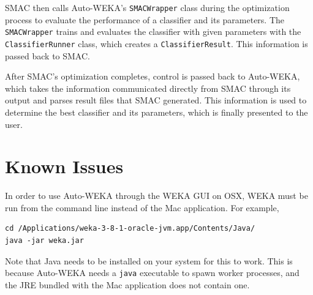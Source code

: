 \documentclass{article}
\begin{document}
SMAC then calls Auto-WEKA's \verb=SMACWrapper= class during the optimization
process to evaluate the performance of a classifier and its parameters. The
\verb=SMACWrapper= trains and evaluates the classifier with given parameters
with the \verb=ClassifierRunner= class, which creates a \verb=ClassifierResult=.
This information is passed back to SMAC.

After SMAC's optimization completes, control is passed back to Auto-WEKA, which
takes the information communicated directly from SMAC through its output and
parses result files that SMAC generated. This information is used to determine
the best classifier and its parameters, which is finally presented to the user.

\section{Known Issues}

In order to use Auto-WEKA through the WEKA GUI on OSX, WEKA must be run from the
command line instead of the Mac application. For example,

\begin{verbatim}
cd /Applications/weka-3-8-1-oracle-jvm.app/Contents/Java/
java -jar weka.jar
\end{verbatim}

Note that Java needs to be installed on your system for this to work. This is because
Auto-WEKA needs a \verb=java= executable to spawn worker processes, and the JRE bundled
with the Mac application does not contain one.

\appendix


\end{document}
